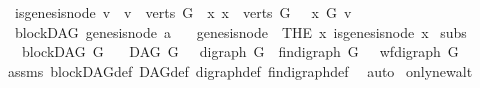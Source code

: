 \begin{isabellebody}
\ \ {\isachardoublequoteopen}is{\isacharunderscore}{\kern0pt}genesis{\isacharunderscore}{\kern0pt}node\ v\ {\isacharequal}{\kern0pt}\ {\isacharparenleft}{\kern0pt}{\isacharparenleft}{\kern0pt}v\ {\isasymin}\ verts\ G{\isacharparenright}{\kern0pt}\ {\isasymand}\ {\isacharparenleft}{\kern0pt}{\isasymforall}x{\isachardot}{\kern0pt}\ {\isacharparenleft}{\kern0pt}x\ {\isasymin}\ verts\ G{\isacharparenright}{\kern0pt}\ {\isasymlongrightarrow}\ \ x\ {\isasymrightarrow}\isactrlsup {\isacharasterisk}{\kern0pt}\isactrlbsub G\isactrlesub \ v{\isacharparenright}{\kern0pt}{\isacharparenright}{\kern0pt}{\isachardoublequoteclose}\isanewline
\isanewline
{}\isamarkupfalse%
\ {\isacharparenleft}{\kern0pt}\ blockDAG{\isacharparenright}{\kern0pt}\ genesis{\isacharunderscore}{\kern0pt}node{\isacharcolon}{\kern0pt}{\isacharcolon}{\kern0pt}\ {\isachardoublequoteopen}{\isacharprime}{\kern0pt}a{\isachardoublequoteclose}\isanewline
\ \ \ {\isachardoublequoteopen}genesis{\isacharunderscore}{\kern0pt}node\ {\isacharequal}{\kern0pt}\ {\isacharparenleft}{\kern0pt}THE\ x{\isachardot}{\kern0pt}\ is{\isacharunderscore}{\kern0pt}genesis{\isacharunderscore}{\kern0pt}node\ x{\isacharparenright}{\kern0pt}{\isachardoublequoteclose}%
\isadelimdocument
%
\endisadelimdocument
%
\isatagdocument
%
\isamarkuptrue%
%
\endisatagdocument
{\isafolddocument}%
%
\isadelimdocument
%
\endisadelimdocument
{}\isamarkupfalse%
\ subs{\isacharcolon}{\kern0pt}\isanewline
\ \ \ {\isachardoublequoteopen}blockDAG\ G{\isachardoublequoteclose}\isanewline
\ \ \ {\isachardoublequoteopen}DAG\ G{\isachardoublequoteclose}\ \ \ {\isachardoublequoteopen}digraph\ G{\isachardoublequoteclose}\ \ {\isachardoublequoteopen}fin{\isacharunderscore}{\kern0pt}digraph\ G{\isachardoublequoteclose}\ \ \ {\isachardoublequoteopen}wf{\isacharunderscore}{\kern0pt}digraph\ G{\isachardoublequoteclose}\isanewline
%
\isadelimproof
\ \ %
\endisadelimproof
%
\isatagproof
{}\isamarkupfalse%
\ assms\ blockDAG{\isacharunderscore}{\kern0pt}def\ DAG{\isacharunderscore}{\kern0pt}def\ digraph{\isacharunderscore}{\kern0pt}def\ fin{\isacharunderscore}{\kern0pt}digraph{\isacharunderscore}{\kern0pt}def\ \isamarkupfalse%
\ auto%
\endisatagproof
{\isafoldproof}%
%
\isadelimproof
\isanewline
%
\endisadelimproof
\isanewline
{}\isamarkupfalse%
\ only{\isacharunderscore}{\kern0pt}new{\isacharunderscore}{\kern0pt}alt{\isacharcolon}{\kern0pt}\ \isanewline

\end{isabellebody}
